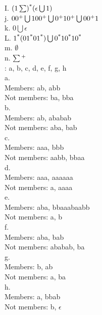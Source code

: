 \documentclass[12pt]{article}
\begin{document}
I. $(1 \sum) \textsuperscript{*}(\epsilon \bigcup 1) $ \\

j. $00 \textsuperscript{+} \bigcup 100 \textsuperscript{+} \bigcup 0 \textsuperscript{+}
    10 \textsuperscript{+} \bigcup 00 \textsuperscript{+} 1 $ \\

k. $ 0 \bigcup \epsilon $ \\

L. $ 1 \textsuperscript{*} (01\textsuperscript{*}01\textsuperscript{*}) \bigcup 0 
     \textsuperscript{*} 10 \textsuperscript{*} 10 \textsuperscript{*} $ \\

m. $ \emptyset $ \\

n. $ \sum \textsuperscript{+} $ \\

: a, b, c, d, e, f, g, h \\

\noindent
a. \\
Members: ab, abb \\
Not members: ba, bba \\

\noindent
b. \\
Members: ab, ababab \\
Not members: aba, bab \\

\noindent
c. \\
Members: aaa, bbb \\
Not members: aabb, bbaa \\

\noindent
d. \\
Members: aaa, aaaaaa  \\
Not members: a, aaaa
 \\

\noindent
e. \\
Members: aba, bbaaabaabb \\
Not members: a, b
 \\

\noindent
f. \\
Members: aba, bab \\
Not members: ababab, ba \\

\noindent
g. \\
Members: b, ab \\
Not members: a, ba \\

\noindent
h. \\
Members: a, bbab \\
Not members: b, $\epsilon$
\\

 \\

 \\
\end{document}

